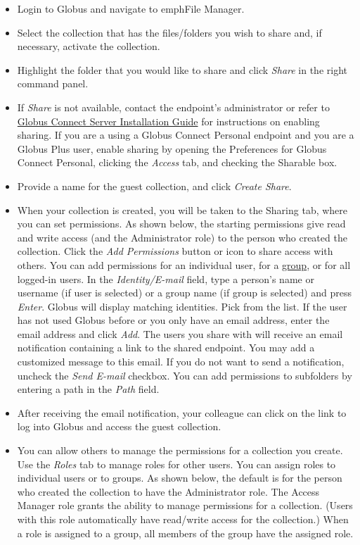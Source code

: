 \begin{itemize}
\item Login to Globus and navigate to emph{File Manager}.
\item Select the collection that has the files/folders you wish to share and, if necessary, activate the collection.
\item Highlight the folder that you would like to share and click \emph{Share} in the right command panel.
\item If \emph{Share} is not available, contact the endpoint’s administrator or refer to \href{https://docs.globus.org/globus-connect-server-installation-guide/}{Globus Connect Server Installation Guide} for instructions on enabling sharing. If you are a using a \gls{Globus Connect} Personal endpoint and you are a Globus Plus user, enable sharing by opening the Preferences for \gls{Globus Connect} Personal, clicking the \emph{Access} tab, and checking the Sharable box.
\item Provide a name for the guest collection, and click \emph{Create Share}.
\item When your collection is created, you will be taken to the Sharing tab, where you can set permissions. As shown below, the starting permissions give read and write access (and the Administrator role) to the person who created the collection.
Click the \emph{Add Permissions} button or icon to share access with others. You can add permissions for an individual user, for a \href{https://docs.globus.org/how-to/managing-groups/}{group}, or for all logged-in users. In the \emph{Identity/E-mail} field, type a person's name or username (if user is selected) or a group name (if group is selected) and press \emph{Enter}. Globus will display matching identities. Pick from the list. If the user has not used Globus before or you only have an email address, enter the email address and click \emph{Add}.
The users you share with will receive an email notification containing a link to the shared endpoint. You may add a customized message to this email. If you do not want to send a notification, uncheck the \emph{Send E-mail} checkbox.
You can add permissions to subfolders by entering a path in the \emph{Path} field.
\item After receiving the email notification, your colleague can click on the link to log into Globus and access the guest collection.
\item You can allow others to manage the permissions for a collection you create. Use the \emph{Roles} tab to manage roles for other users. You can assign roles to individual users or to groups. As shown below, the default is for the person who created the collection to have the Administrator role.
The Access Manager role grants the ability to manage permissions for a collection. (Users with this role automatically have read/write access for the collection.)
When a role is assigned to a group, all members of the group have the assigned role.
\end{itemize}

